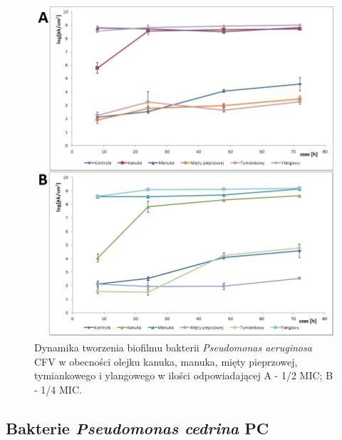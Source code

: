 \documentclass[11pt,a4paper]{report}
\begin{document}
\begin{figure}[!h]
\begin{center}
\includegraphics[scale=0.7]{img/cfv-b.png}
\caption{Dynamika tworzenia biofilmu bakterii \textit{Pseudomonas aeruginosa} CFV w obecności olejku kanuka, manuka, mięty pieprzowej, tymiankowego i ylangowego w ilości odpowiadającej A - 1/2 MIC; B - 1/4 MIC.}\label{cfv-b}
\end{center} 
\end{figure}

\clearpage


\subsection{Bakterie \textit{Pseudomonas cedrina} PC}
\end{document}

